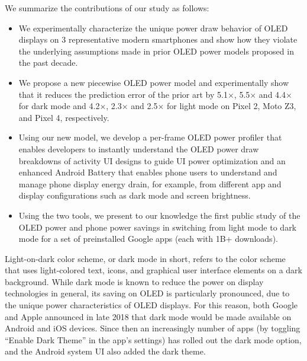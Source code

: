 

We summarize the contributions of our study as follows:
\begin{itemize}[leftmargin=*]
  \item We experimentally characterize the unique power draw behavior
    of OLED displays on 3 representative modern smartphones and show
    how they violate the underlying assumptions made in prior OLED
    power models proposed in the past decade.
  \item We propose a new piecewise OLED power model and experimentally
    show that it reduces the prediction error of the prior art by 
5.1$\times$, 5.5$\times$ and 4.4$\times$ for dark mode
and 4.2$\times$, 2.3$\times$ and 2.5$\times$ for light mode 
    on Pixel 2, Moto Z3, and Pixel 4, respectively.
  \item Using our new model, we develop a per-frame OLED
    power profiler that enables developers to instantly understand the
    OLED power draw breakdowns of activity UI designs to guide UI power optimization and an enhanced Android Battery that enables phone users to
understand and manage phone
display energy drain, for example, from different app and display
configurations such as dark mode and screen brightness.
  \item Using the two tools, we present to our knowledge
    the first public study of the OLED power and phone power
    savings in switching from light mode to dark mode for a
    set of preinstalled Google apps {(each with 1B+ downloads).}
  \end{itemize}




Light-on-dark color scheme, or dark mode in short, refers to the color
scheme that uses light-colored text, icons, and graphical user
interface elements on a dark background.  While dark mode
is known to reduce the power on display technologies in general,
its saving on OLED is particularly pronounced, due to the unique power
characteristics of OLED displays.  For this reason, both Google and
Apple announced in late 2018 that dark mode would be made available on
Android and iOS devices. Since then an increasingly number of apps
(by toggling ``Enable Dark Theme'' in the app's settings) has rolled out
the dark mode option, and the Android system UI also added the dark
theme.

